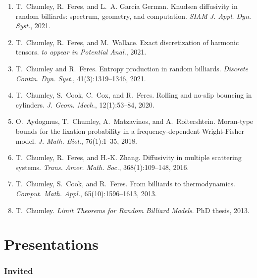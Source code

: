 \documentclass[10pt,letterpaper]{article}
\providecommand{\tightlist}{%
  \setlength{\itemsep}{0pt}\setlength{\parskip}{0pt}}
\let\tightlist\relax
\begin{document}
\begin{enumerate}
\def\labelenumi{\arabic{enumi}.}
\tightlist
\item
  \protect\hypertarget{CFG2020}{}{} T.~Chumley, R.~Feres, and L.~A.
  Garcia German. Knudsen diffusivity in random billiards: spectrum,
  geometry, and computation. \emph{SIAM J. Appl. Dyn. Syst.}, 2021.
\item
  \protect\hypertarget{CFW2016}{}{} T.~Chumley, R.~Feres, and
  M.~Wallace. Exact discretization of harmonic tensors. \emph{to appear
  in Potential Anal.}, 2021.
\item
  \protect\hypertarget{CF2019}{}{} T.~Chumley and R.~Feres. Entropy
  production in random billiards. \emph{Discrete Contin. Dyn. Syst.},
  41(3):1319--1346, 2021.
\item
  \protect\hypertarget{CCCF2018}{}{} T.~Chumley, S.~Cook, C.~Cox, and
  R.~Feres. Rolling and no-slip bouncing in cylinders. \emph{J. Geom.
  Mech.}, 12(1):53--84, 2020.
\item
  \protect\hypertarget{ACMR2016}{}{} O.~Aydogmus, T.~Chumley,
  A.~Matzavinos, and A.~Roitershtein. Moran-type bounds for the fixation
  probability in a frequency-dependent Wright-Fisher model. \emph{J.
  Math. Biol.}, 76(1):1--35, 2018.
\item
  \protect\hypertarget{CFZ2016}{}{} T.~Chumley, R.~Feres, and H.-K.
  Zhang. Diffusivity in multiple scattering systems. \emph{Trans. Amer.
  Math. Soc.}, 368(1):109--148, 2016.
\item
  \protect\hypertarget{CCF2013}{}{} T.~Chumley, S.~Cook, and R.~Feres.
  From billiards to thermodynamics. \emph{Comput. Math. Appl.},
  65(10):1596--1613, 2013.
\item
  \protect\hypertarget{CT}{}{} T.~Chumley. \emph{Limit Theorems for
  Random Billiard Models}. PhD thesis, 2013.
\end{enumerate}

\hypertarget{invited-presentations}{%
\section*{Presentations}\label{invited-presentations}}

\hypertarget{invited}{%
\subsubsection*{Invited}\label{invited}}
\end{document}
